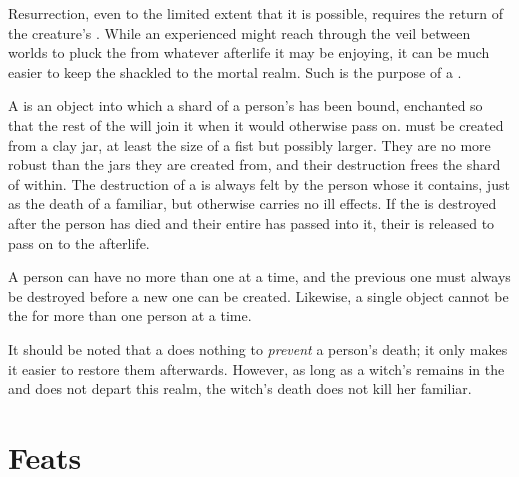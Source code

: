 Resurrection, even to the limited extent that it is possible, requires the return of the creature's {\soul}.
While an experienced  might reach through the veil between worlds to pluck the {\soul} from whatever afterlife it may be enjoying, it can be much easier to keep the {\soul} shackled to the mortal realm.
Such is the purpose of a {\phylactery}.

A {\phylactery} is an object into which a shard of a person's {\soul} has been bound, enchanted so that the rest of the {\soul} will join it when it would otherwise pass on.
\capital{\phylacteries} must be created from a clay jar, at least the size of a fist but possibly larger.
They are no more robust than the jars they are created from, and their destruction frees the shard of {\soul} within.
The destruction of a {\phylactery} is always felt by the person whose {\soul} it contains, just as the death of a familiar, but otherwise carries no ill effects.
If the {\phylactery} is destroyed after the person has died and their entire {\soul} has passed into it, their {\soul} is released to pass on to the afterlife.

A person can have no more than one {\phylactery} at a time, and the previous one must always be destroyed before a new one can be created.
Likewise, a single object cannot be the {\phylactery} for more than one person at a time.

It should be noted that a {\phylactery} does nothing to \emph{prevent} a person's death; it only makes it easier to restore them afterwards.
However, as long as a witch's {\soul} remains in the {\phylactery} and does not depart this realm, the witch's death does not kill her familiar.

\section{Feats}


